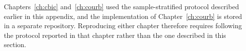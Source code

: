 Chapters~\ref{ch:cbic} and~\ref{ch:courb} used the sample-stratified protocol described
earlier in this appendix, and the implementation of Chapter~\ref{ch:courb} is stored in
a separate repository. Reproducing either chapter therefore requires following the
protocol reported in that chapter rather than the one described in this section.
